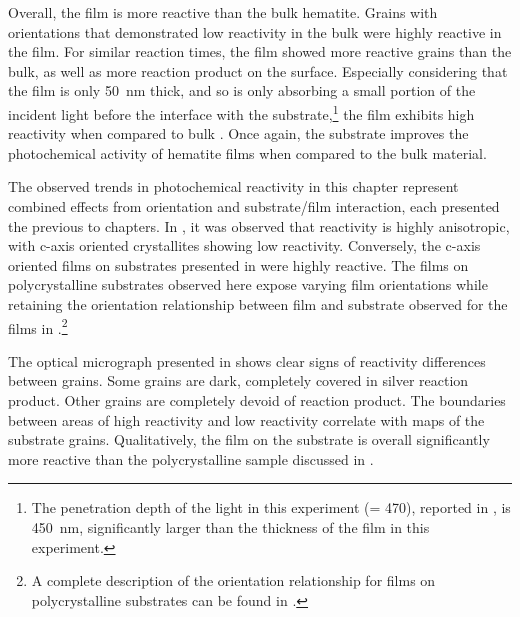 Overall, the film is more reactive than the bulk hematite. Grains with orientations that
demonstrated low reactivity in the bulk were highly reactive in the film. For similar
reaction times, the film showed more reactive grains than the bulk, as well as more
reaction product on the surface. Especially considering that the film is only
\SI{50}{\nano\meter} thick, and so is only absorbing a small portion of the incident light
before the interface with the substrate,\footnote{The penetration depth of the light in
this experiment (\textlambda = \si{470}{\nano\meter}), reported in
, is \texttildelow\SI{450}{\nano\meter},
significantly larger than the thickness of the film in this experiment.} the film exhibits
high reactivity when compared to bulk . Once again, the  substrate
improves the photochemical activity of hematite films when compared to the bulk material.

The observed trends in photochemical reactivity in this chapter represent combined effects
from  orientation and substrate/film interaction, each presented the previous to
chapters. In , it was observed that  reactivity is
highly anisotropic, with c-axis oriented crystallites showing low reactivity. Conversely,
the c-axis oriented films on  substrates presented in
 were highly reactive. The films on polycrystalline
substrates observed here expose varying film orientations while retaining the orientation
relationship between film and substrate observed for the films in
.\footnote{A complete description of the orientation
relationship for  films on polycrystalline  substrates can be found
in .}

The optical micrograph presented in  shows clear signs of
reactivity differences between grains. Some grains are dark, completely covered in silver
reaction product. Other grains are completely devoid of reaction product. The boundaries
between areas of high reactivity and low reactivity correlate with  maps of the
substrate grains. Qualitatively, the  film on the  substrate is
overall significantly more reactive than the polycrystalline sample discussed in
. 

